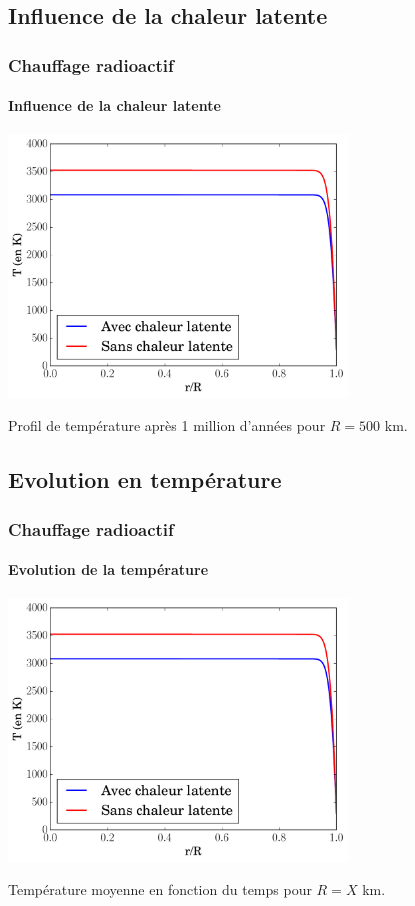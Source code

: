 \documentclass{beamer}
\begin{document}
\subsection{Influence de la chaleur latente}

\begin{frame}
	\frametitle{Chauffage radioactif}
	\framesubtitle{Influence de la chaleur latente}
\vspace{-0.5cm}

\center \includegraphics[width = 9cm]{figures/diffusion1.pdf}
  
Profil de température après 1 million d'années pour $R = 500$ km.
	  	
\end{frame}



\subsection{Evolution en température}

\begin{frame}
	\frametitle{Chauffage radioactif}
	\framesubtitle{Evolution de la température}
\vspace{-0.5cm}

\center \includegraphics[width = 9cm]{figures/diffusion1.pdf}  

Température moyenne en fonction du temps pour $R = X$ km.
	  	
\end{frame}
\end{document}
